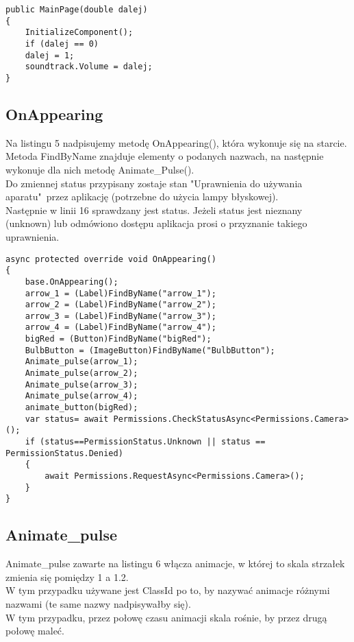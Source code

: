 \begin{lstlisting}[caption=MainPage]
public MainPage(double dalej)
{
	InitializeComponent();
	if (dalej == 0)
	dalej = 1;
	soundtrack.Volume = dalej;
}
\end{lstlisting}

\subsection{OnAppearing}
Na listingu 5 nadpisujemy metodę OnAppearing(), która wykonuje się na starcie.
\\
Metoda FindByName znajduje elementy o podanych nazwach, na następnie wykonuje dla nich metodę Animate\_Pulse().
\\
Do zmiennej status przypisany zostaje stan "Uprawnienia do używania aparatu"~przez aplikację (potrzebne do użycia lampy błyskowej).
\\
Następnie w linii 16 sprawdzany jest status. Jeżeli status jest nieznany (unknown) lub odmówiono dostępu aplikacja prosi o przyznanie takiego uprawnienia.

\begin{lstlisting}[caption=OnAppearing]
async protected override void OnAppearing()
{
	base.OnAppearing();
	arrow_1 = (Label)FindByName("arrow_1");
	arrow_2 = (Label)FindByName("arrow_2");
	arrow_3 = (Label)FindByName("arrow_3");
	arrow_4 = (Label)FindByName("arrow_4");
	bigRed = (Button)FindByName("bigRed");
	BulbButton = (ImageButton)FindByName("BulbButton");
	Animate_pulse(arrow_1);
	Animate_pulse(arrow_2);
	Animate_pulse(arrow_3);
	Animate_pulse(arrow_4);
	animate_button(bigRed);
	var status= await Permissions.CheckStatusAsync<Permissions.Camera>();
	if (status==PermissionStatus.Unknown || status == PermissionStatus.Denied)
	{
		await Permissions.RequestAsync<Permissions.Camera>();
	}
}
\end{lstlisting}

\subsection{Animate\_pulse}
Animate\_pulse zawarte na listingu 6 włącza animacje, w której to skala strzałek zmienia się pomiędzy 1 a 1.2.
\\
W tym przypadku używane jest ClassId po to, by nazywać animacje różnymi nazwami (te same nazwy nadpisywałby się).
\\
W tym przypadku, przez połowę czasu animacji skala rośnie, by przez drugą połowę maleć.

